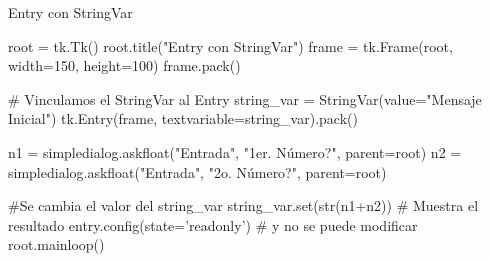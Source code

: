 \documentclass[10pt, envcountsect , spanish]{beamer}
\begin{document}
\begin{frame}[fragile]{Entry con StringVar}
\small
\begin{pyverbatim}[][frame=single]
root = tk.Tk()
root.title("Entry con StringVar")
frame = tk.Frame(root, width=150, height=100)
frame.pack()

# Vinculamos el StringVar al Entry
string_var = StringVar(value="Mensaje Inicial")
tk.Entry(frame, textvariable=string_var).pack()

n1 = simpledialog.askfloat("Entrada", 
                           "1er. Número?",
                            parent=root)
n2 = simpledialog.askfloat("Entrada", 
                           "2o. Número?", 
                           parent=root)

#Se cambia el valor del string_var
string_var.set(str(n1+n2))      # Muestra el resultado
entry.config(state='readonly')  # y no se puede modificar
root.mainloop()
\end{pyverbatim}


\end{frame}
\end{document}

